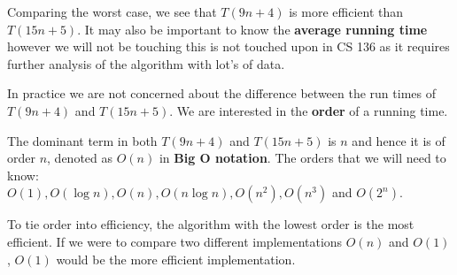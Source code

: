 
Comparing the worst case, we see that $T(9n + 4)$ is more efficient than $T(15n + 5)$. It may also be important to know the \textbf{average running time} however we will not be touching this is not touched upon in CS 136 as it requires further analysis of the algorithm with lot's of data.\\


In practice we are not concerned about the difference between the run times of $T(9n + 4)$ and $T(15n + 5)$. We are interested in the \textbf{order} of a running time.\\



The dominant term in both $T(9n + 4)$ and $T(15n + 5)$ is $n$ and hence it is of order $n$, denoted as $O(n)$ in \textbf{Big O notation}. The orders that we will need to know:\\

$O(1), O(\log{n}), O(n), O(n\log{n}), O(n^{2}), O(n^{3})$ and $O(2^{n})$.\\


To tie order into efficiency, the algorithm with the lowest order is the most efficient. If we were to compare two different implementations $O(n)$ and $O(1)$, $O(1)$ would be the more efficient implementation.


